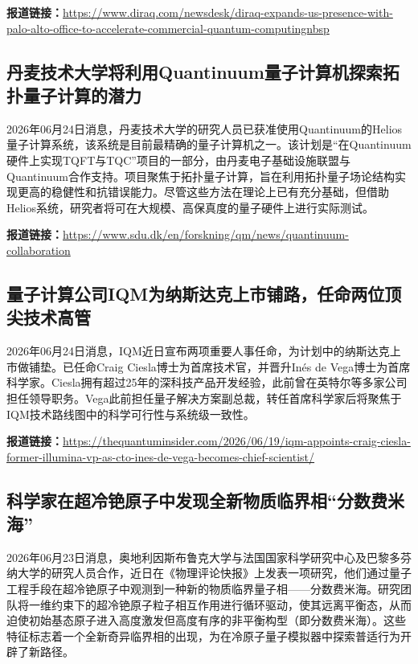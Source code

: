 \documentclass[12pt,a4paper]{ctexart}
\begin{document}
\noindent\textbf{报道链接：}\url{https://www.diraq.com/newsdesk/diraq-expands-us-presence-with-palo-alto-office-to-accelerate-commercial-quantum-computingnbsp}

\subsection{ 丹麦技术大学将利用Quantinuum量子计算机探索拓扑量子计算的潜力 }

2026年06月24日消息，丹麦技术大学的研究人员已获准使用Quantinuum的Helios量子计算系统，该系统是目前最精确的量子计算机之一。该计划是“在Quantinuum硬件上实现TQFT与TQC”项目的一部分，由丹麦电子基础设施联盟与Quantinuum合作支持。项目聚焦于拓扑量子计算，旨在利用拓扑量子场论结构实现更高的稳健性和抗错误能力。尽管这些方法在理论上已有充分基础，但借助Helios系统，研究者将可在大规模、高保真度的量子硬件上进行实际测试。

\noindent\textbf{报道链接：}\url{https://www.sdu.dk/en/forskning/qm/news/quantinuum-collaboration}

\subsection{ 量子计算公司IQM为纳斯达克上市铺路，任命两位顶尖技术高管 }

2026年06月24日消息，IQM近日宣布两项重要人事任命，为计划中的纳斯达克上市做铺垫。已任命Craig Ciesla博士为首席技术官，并晋升Inés de Vega博士为首席科学家。Ciesla拥有超过25年的深科技产品开发经验，此前曾在英特尔等多家公司担任领导职务。Vega此前担任量子解决方案副总裁，转任首席科学家后将聚焦于IQM技术路线图中的科学可行性与系统级一致性。

\noindent\textbf{报道链接：}\url{https://thequantuminsider.com/2026/06/19/iqm-appoints-craig-ciesla-former-illumina-vp-as-cto-ines-de-vega-becomes-chief-scientist/}

\subsection{ 科学家在超冷铯原子中发现全新物质临界相“分数费米海” }

2026年06月23日消息，奥地利因斯布鲁克大学与法国国家科学研究中心及‌巴黎多芬纳大学的研究人员合作，近日在《物理评论快报》上发表一项研究，他们通过量子工程手段在超冷铯原子中观测到一种新的物质临界量子相——分数费米海。研究团队将一维约束下的超冷铯原子粒子相互作用进行循环驱动，使其远离平衡态，从而迫使初始基态原子进入高度激发但高度有序的非平衡构型（即分数费米海）。这些特征标志着一个全新奇异临界相的出现，为在冷原子量子模拟器中探索普适行为开辟了新路径。
\end{document}

